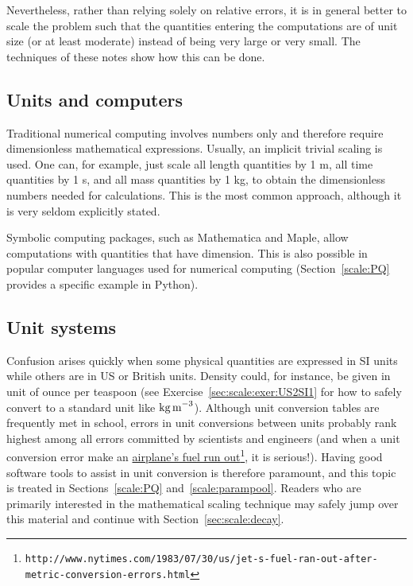 \documentclass[graybox,envcountchap,sectrefs,final]{svmonodo}
\begin{document}
Nevertheless, rather than relying solely on relative errors, it is in general
better to scale the problem such that the quantities entering the
computations are of unit size (or at least moderate) instead of being very
large or very small. The techniques of these notes show how this
can be done.

\subsection{Units and computers}

Traditional numerical computing involves numbers only and therefore
require dimensionless mathematical expressions. Usually, an implicit
trivial scaling is used. One can, for example, just scale all length
quantities by 1 m, all time quantities by 1 s, and all mass quantities
by 1 kg, to obtain the dimensionless numbers needed for calculations.
This is the most common approach, although it is very seldom explicitly
stated.

Symbolic computing packages, such as Mathematica and Maple, allow
computations with quantities that have dimension. This is also possible
in popular computer languages used for numerical computing (Section~\ref{scale:PQ} provides a specific example in Python).


\subsection{Unit systems}


Confusion arises quickly when some physical quantities are expressed
in SI units while others are in US or British units.  Density could,
for instance, be given in unit of ounce per teaspoon (see Exercise~\ref{sec:scale:exer:US2SI1} for how to safely convert to a standard
unit like $\hbox{kg\,m}^{-3}$).  Although unit conversion tables are
frequently met in school, errors in unit conversions between units
probably rank highest among all errors committed by scientists and
engineers (and when a unit conversion error make an \href{{http://www.nytimes.com/1983/07/30/us/jet-s-fuel-ran-out-after-metric-conversion-errors.html}}{airplane's fuel
run out}\footnote{\texttt{http://www.nytimes.com/1983/07/30/us/jet-s-fuel-ran-out-after-metric-conversion-errors.html}},
it is serious!).  Having good software tools to assist in unit
conversion is therefore paramount, and this topic is treated in
Sections~\ref{scale:PQ} and~\ref{scale:parampool}.  Readers who are
primarily interested in the mathematical scaling technique may safely
jump over this material and continue with Section~\ref{sec:scale:decay}.
\end{document}
